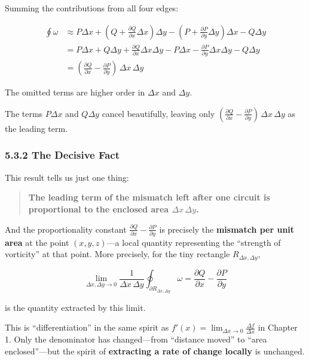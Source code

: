 Summing the contributions from all four edges:

\[\begin{aligned}
\oint \omega &\approx P\Delta x + (Q + \frac{\partial Q}{\partial x}\Delta x)\Delta y - (P + \frac{\partial P}{\partial y}\Delta y)\Delta x - Q\Delta y \\
&= P\Delta x + Q\Delta y + \frac{\partial Q}{\partial x}\Delta x\Delta y - P\Delta x - \frac{\partial P}{\partial y}\Delta x\Delta y - Q\Delta y \\
&= (\frac{\partial Q}{\partial x} - \frac{\partial P}{\partial y})\,\Delta x\,\Delta y
\end{aligned}\]

The omitted terms are higher order in \(\Delta x\) and \(\Delta y\).

The terms \(P\Delta x\) and \(Q\Delta y\) cancel beautifully, leaving
only
\((\frac{\partial Q}{\partial x} - \frac{\partial P}{\partial y})\,\Delta x\,\Delta y\)
as the leading term.

\hypertarget{the-decisive-fact}{%
\subsubsection{5.3.2 The Decisive Fact}\label{the-decisive-fact}}

This result tells us just one thing:

\begin{quote}
\textbf{The leading term of the mismatch left after one circuit is proportional to the enclosed area $\Delta x\,\Delta y$.}
\end{quote}

And the proportionality constant
\(\frac{\partial Q}{\partial x} - \frac{\partial P}{\partial y}\) is
precisely the \textbf{mismatch per unit area} at the point
\((x,y,z)\)---a local quantity representing the ``strength of
vorticity'' at that point. More precisely, for the tiny rectangle
\(R_{\Delta x,\Delta y}\),

\[\lim_{\Delta x,\Delta y\to 0}\frac{1}{\Delta x\,\Delta y}\oint_{\partial R_{\Delta x,\Delta y}}\omega = \frac{\partial Q}{\partial x} - \frac{\partial P}{\partial y}\]

is the quantity extracted by this limit.

This is ``differentiation'' in the same spirit as
\(f'(x) = \lim_{\Delta x\to 0} \frac{\Delta f}{\Delta x}\) in Chapter 1.
Only the denominator has changed---from ``distance moved'' to ``area
enclosed''---but the spirit of
\textbf{extracting a rate of change locally} is unchanged.

